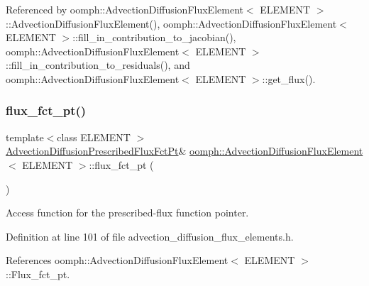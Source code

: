 Referenced by oomph\+::\+Advection\+Diffusion\+Flux\+Element$<$ E\+L\+E\+M\+E\+N\+T $>$\+::\+Advection\+Diffusion\+Flux\+Element(), oomph\+::\+Advection\+Diffusion\+Flux\+Element$<$ E\+L\+E\+M\+E\+N\+T $>$\+::fill\+\_\+in\+\_\+contribution\+\_\+to\+\_\+jacobian(), oomph\+::\+Advection\+Diffusion\+Flux\+Element$<$ E\+L\+E\+M\+E\+N\+T $>$\+::fill\+\_\+in\+\_\+contribution\+\_\+to\+\_\+residuals(), and oomph\+::\+Advection\+Diffusion\+Flux\+Element$<$ E\+L\+E\+M\+E\+N\+T $>$\+::get\+\_\+flux().

\mbox{\label{classoomph_1_1AdvectionDiffusionFluxElement_a8d78c95241fe2615ea63040e4072627d}} 
\subsubsection{\texorpdfstring{flux\+\_\+fct\+\_\+pt()}{flux\_fct\_pt()}}
{\footnotesize\ttfamily template$<$class E\+L\+E\+M\+E\+NT $>$ \\
\hyperlink{classoomph_1_1AdvectionDiffusionFluxElement_aeb9eb0a65d6dfe3673f6910a6fd7cf59}{Advection\+Diffusion\+Prescribed\+Flux\+Fct\+Pt}\& \hyperlink{classoomph_1_1AdvectionDiffusionFluxElement}{oomph\+::\+Advection\+Diffusion\+Flux\+Element}$<$ E\+L\+E\+M\+E\+NT $>$\+::flux\+\_\+fct\+\_\+pt (\begin{DoxyParamCaption}{ }\end{DoxyParamCaption})\hspace{0.3cm}{\ttfamily [inline]}}



Access function for the prescribed-\/flux function pointer. 



Definition at line 101 of file advection\+\_\+diffusion\+\_\+flux\+\_\+elements.\+h.



References oomph\+::\+Advection\+Diffusion\+Flux\+Element$<$ E\+L\+E\+M\+E\+N\+T $>$\+::\+Flux\+\_\+fct\+\_\+pt.

\mbox{\label{classoomph_1_1AdvectionDiffusionFluxElement_ab21b7655c7d09d338bc4be4baf4dfca6}} 
